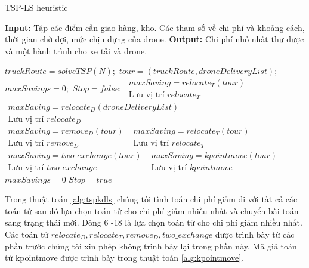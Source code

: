 \documentclass[a4paper,12pt]{report}
\begin{document}
\begin{algorithm}[H]
\caption{TSP-LS heuristic}
\textbf{Input:} Tập các điểm cần giao hàng, kho. Các tham số về chi phí và khoảng cách, thời gian chờ đợi, mức chịu đựng của drone.
\textbf{Output:} Chi phí nhỏ nhất thư được và một hành trình cho xe tải và drone.
\begin{algorithmic}[1]
\State $truckRoute = solveTSP(N);$
\State $tour = (truckRoute, droneDeliveryList);$
\State $maxSavings = 0;$
\State $Stop = false;$
\Repeat
{}
\State $\begin{array}{l}
maxSaving=relocate_T(tour) \\
\text{Lưu vị trí } relocate_T
\end{array}$
\State $\begin{array}{l}
maxSaving=relocate_D(droneDeliveryList) \\
\text{Lưu vị trí } relocate_D
\end{array}$
\State $\begin{array}{l}
maxSaving=remove_D(tour) \\
\text{Lưu vị trí } remove_D
\end{array}$
\State $\begin{array}{l}
maxSaving=relocate_T(tour) \\
\text{Lưu vị trí } relocate_T
\end{array}$
\State $\begin{array}{l}
maxSaving=two\_exchange(tour) \\
\text{Lưu vị trí } two\_exchange
\end{array}$
\State $\begin{array}{l}
maxSaving=kpointmove(tour) \\
\text{Lưu vị trí } kpointmove
\end{array}$
\EndIf
{} 
\State $maxSavings=0$
\Else 
\State $Stop=true$
\EndIf

\end{algorithmic}
\label{alg:tspkdls}
\end{algorithm}
Trong thuật toán \ref{alg:tspkdls} chúng tôi tình toán chi phí giảm đi với tất cả các toán tử sau đó lựa chọn toán tử cho chi phí giảm nhiều nhất và chuyển bài toán sang trạng thái mới. Dòng 6 -18 là lựa chọn toán tử cho chi phí giảm nhiều nhất. Các toán tử $relocate_D, relocate_T, remove_D, two\_exchange$ được trình bày từ các phần trước chúng tôi xin phép không trình bày lại trong phần này. Mã giả toán tử kpointmove được trình bày trong thuật toán \ref{alg:kpointmove}.
\end{document}
